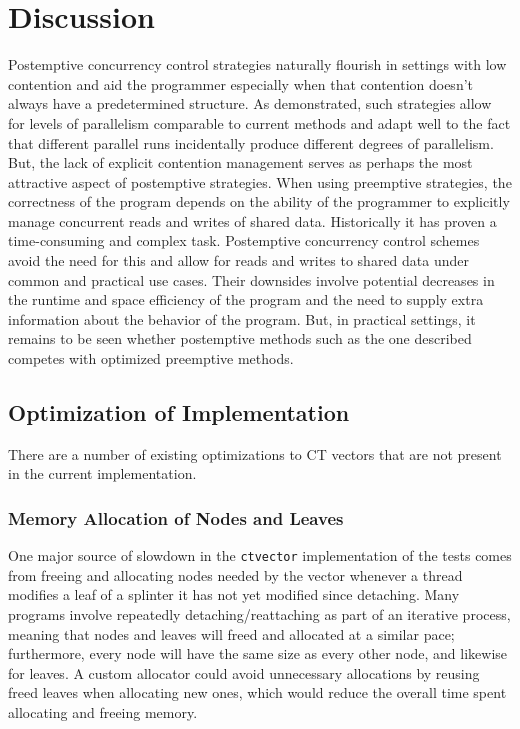 \chapter{Discussion}

Postemptive concurrency control strategies naturally flourish in settings with
low contention and aid the programmer especially when that contention doesn't
always have a predetermined structure. As demonstrated, such strategies allow
for levels of parallelism comparable to current methods and adapt well to the
fact that different parallel runs incidentally produce different degrees of
parallelism. But, the lack of explicit contention management serves as perhaps
the most attractive aspect of postemptive strategies. When using preemptive
strategies, the correctness of the program depends on the ability of the
programmer to explicitly manage concurrent reads and writes of shared data.
Historically it has proven a time-consuming and complex task. Postemptive
concurrency control schemes avoid the need for this and allow for reads and
writes to shared data under common and practical use cases. Their downsides
involve potential decreases in the runtime and space efficiency of the program
and the need to supply extra information about the behavior of the program. But,
in practical settings, it remains to be seen whether postemptive methods such as
the one described competes with optimized preemptive methods.

\section{Optimization of Implementation}
There are a number of existing optimizations to CT vectors that are not present
in the current implementation.

\subsection{Memory Allocation of Nodes and Leaves}
One major source of slowdown in the \texttt{ctvector} implementation of the
tests comes from freeing and allocating nodes needed by the vector whenever a
thread  modifies a leaf of a splinter it has not yet modified since detaching.
Many programs involve repeatedly detaching/reattaching as part of an iterative
process, meaning that nodes and leaves will freed and allocated at a similar
pace; furthermore, every node will have the same size as every other node, and
likewise for leaves. A custom allocator could avoid unnecessary allocations by
reusing freed leaves when allocating new ones, which would reduce the overall
time spent allocating and freeing memory.

